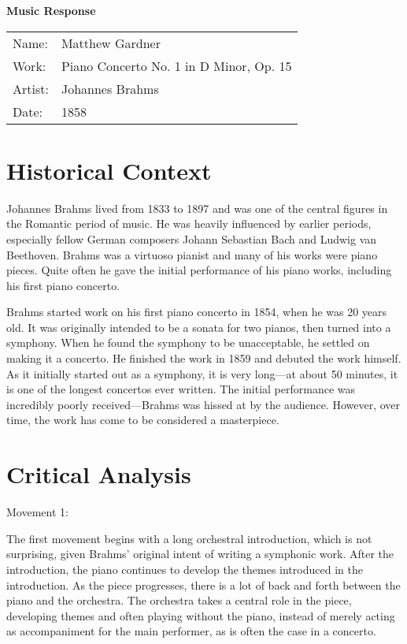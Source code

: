 \documentclass[onecolumn, 12pt]{article}
\title{}
\author{Matthew Gardner}
\date{}
\begin{document}
\textbf{Music Response}

\begin{tabular}{ll}
  Name:&Matthew Gardner \\
  Work:&Piano Concerto No. 1 in D Minor, Op. 15 \\
  Artist:&Johannes Brahms \\
  Date:&1858 \\
\end{tabular}

\section*{Historical Context}

Johannes Brahms lived from 1833 to 1897 and was one of the central figures in
the Romantic period of music.  He was heavily influenced by earlier periods,
especially fellow German composers Johann Sebastian Bach and Ludwig van
Beethoven.  Brahms was a virtuoso pianist and many of his works were piano
pieces.  Quite often he gave the initial performance of his piano works, 
including his first piano concerto.

Brahms started work on his first piano concerto in 1854, when he was 20 years
old.  It was originally intended to be a sonata for two pianos, then turned
into a symphony.  When he found the symphony to be unacceptable, he settled on
making it a concerto.  He finished the work in 1859 and debuted the work
himself.  As it initially started out as a symphony, it is very long---at about
50 minutes, it is one of the longest concertos ever written.  The initial
performance was incredibly poorly received---Brahms was hissed at by the
audience.  However, over time, the work has come to be considered a
masterpiece.

\section*{Critical Analysis}

Movement 1:

The first movement begins with a long orchestral introduction, which is not
surprising, given Brahms' original intent of writing a symphonic work.  After
the introduction, the piano continues to develop the themes introduced in the
introduction.  As the piece progresses, there is a lot of back and forth
between the piano and the orchestra.  The orchestra takes a central role in the
piece, developing themes and often playing without the piano, instead of merely
acting as accompaniment for the main performer, as is often the case in a
concerto.
\end{document}
